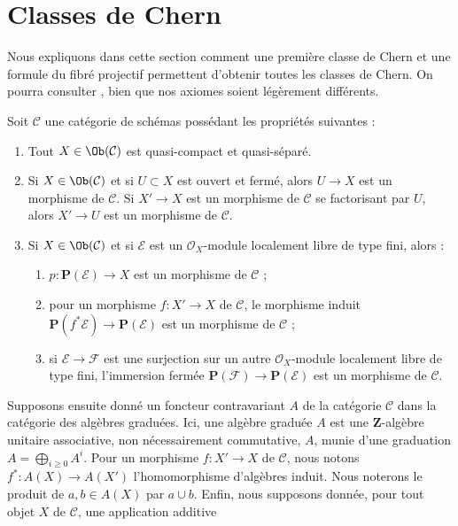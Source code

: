 \section{Classes de Chern}
\label{section-chern}

\noindent
Nous expliquons dans cette section comment une première classe de Chern et
une formule du fibré projectif permettent d'obtenir toutes les classes de Chern.
On pourra consulter \cite{Grothendieck-chern}, bien que nos axiomes
soient légèrement différents.

\medskip\noindent
Soit $\mathcal{C}$ une catégorie de schémas possédant les propriétés suivantes :
\begin{enumerate}
\item Tout $X \in \Ob(\mathcal{C})$ est quasi-compact et quasi-séparé.
\item Si $X \in \Ob(\mathcal{C})$ et si $U \subset X$ est ouvert et fermé,
alors $U \to X$ est un morphisme de $\mathcal{C}$. Si $X' \to X$ est un morphisme
de $\mathcal{C}$ se factorisant par $U$, alors $X' \to U$ est un morphisme
de $\mathcal{C}$.
\item Si $X \in \Ob(\mathcal{C})$ et si $\mathcal{E}$ est un
$\mathcal{O}_X$-module localement libre de type fini, alors :
\begin{enumerate}
\item $p : \mathbf{P}(\mathcal{E}) \to X$ est un morphisme de $\mathcal{C}$ ;
\item pour un morphisme $f : X' \to X$ de $\mathcal{C}$,
le morphisme induit $\mathbf{P}(f^*\mathcal{E}) \to \mathbf{P}(\mathcal{E})$
est un morphisme de $\mathcal{C}$ ;
\item si $\mathcal{E} \to \mathcal{F}$ est une surjection sur un autre
$\mathcal{O}_X$-module localement libre de type fini, l'immersion fermée
$\mathbf{P}(\mathcal{F}) \to \mathbf{P}(\mathcal{E})$
est un morphisme de $\mathcal{C}$.
\end{enumerate}
\end{enumerate}
Supposons ensuite donné un foncteur contravariant $A$ de
la catégorie $\mathcal{C}$ dans la catégorie des algèbres graduées.
Ici, une algèbre graduée $A$ est une
$\mathbf{Z}$-algèbre unitaire associative, non nécessairement commutative, $A$, munie d'une graduation
$A = \bigoplus_{i \geq 0} A^i$. Pour un morphisme
$f : X' \to X$ de $\mathcal{C}$, nous notons $f^* : A(X) \to A(X')$
l'homomorphisme d'algèbres induit.
Nous noterons le produit de $a, b \in A(X)$ par $a \cup b$.
Enfin, nous supposons
donnée, pour tout objet $X$ de $\mathcal{C}$, une application additive
